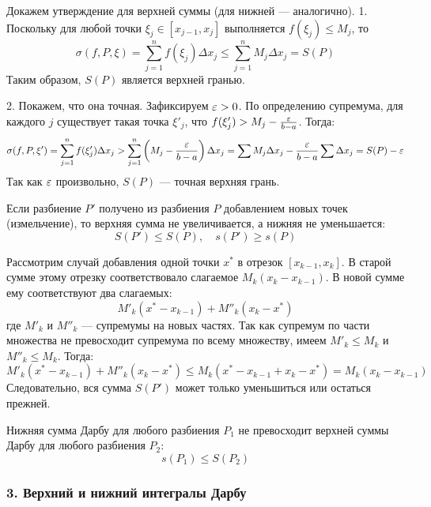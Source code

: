 \begin{tcolorbox}[title=Доказательство, breakable]
Докажем утверждение для верхней суммы (для нижней — аналогично). 
1. Поскольку для любой точки $\xi_j \in [x_{j-1}, x_j]$ выполняется $f(\xi_j) \le M_j$, то
\[ \sigma(f, P, \xi) = \sum_{j=1}^n f(\xi_j) \Delta x_j \le \sum_{j=1}^n M_j \Delta x_j = S(P) \]
Таким образом, $S(P)$ является верхней гранью.

2. Покажем, что она точная. Зафиксируем $\varepsilon > 0$. По определению супремума, для каждого $j$ существует такая точка $\xi'_j$, что $f(\xi'_j) > M_j - \frac{\varepsilon}{b-a}$. Тогда:
\[ \sigma(f, P, \xi') = \sum_{j=1}^n f(\xi'_j) \Delta x_j > \sum_{j=1}^n \left( M_j - \frac{\varepsilon}{b-a} \right) \Delta x_j = \sum M_j \Delta x_j - \frac{\varepsilon}{b-a} \sum \Delta x_j = S(P) - \varepsilon \]
Так как $\varepsilon$ произвольно, $S(P)$ — точная верхняя грань.
\end{tcolorbox}

\begin{theorem}
Если разбиение $P'$ получено из разбиения $P$ добавлением новых точек (измельчение), то верхняя сумма не увеличивается, а нижняя не уменьшается:
\[ S(P') \le S(P), \quad s(P') \ge s(P) \]
\end{theorem}

\begin{tcolorbox}[title=Доказательство, breakable]
Рассмотрим случай добавления одной точки $x^*$ в отрезок $[x_{k-1}, x_k]$. В старой сумме этому отрезку соответствовало слагаемое $M_k (x_k - x_{k-1})$. В новой сумме ему соответствуют два слагаемых:
\[ M'_k (x^* - x_{k-1}) + M''_k (x_k - x^*) \]
где $M'_k$ и $M''_k$ — супремумы на новых частях. Так как супремум по части множества не превосходит супремума по всему множеству, имеем $M'_k \le M_k$ и $M''_k \le M_k$. Тогда:
\[ M'_k (x^* - x_{k-1}) + M''_k (x_k - x^*) \le M_k (x^* - x_{k-1} + x_k - x^*) = M_k (x_k - x_{k-1}) \]
Следовательно, вся сумма $S(P')$ может только уменьшиться или остаться прежней.
\end{tcolorbox}

\begin{theorem}
Нижняя сумма Дарбу для любого разбиения $P_1$ не превосходит верхней суммы Дарбу для любого разбиения $P_2$:
\[ s(P_1) \le S(P_2) \]
\end{theorem}

\subsubsection*{3. Верхний и нижний интегралы Дарбу}

